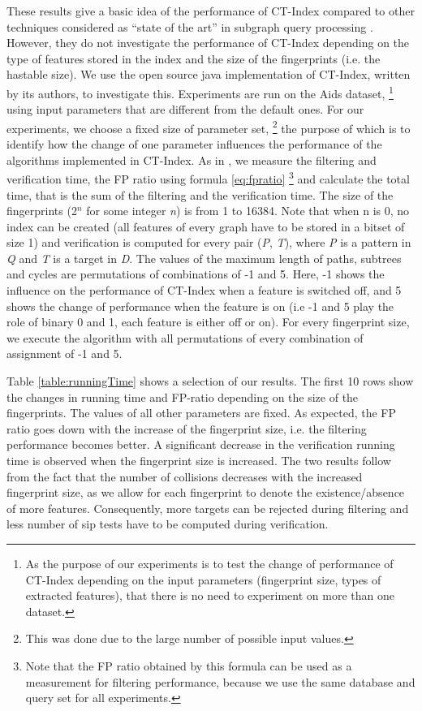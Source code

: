 \documentclass{l4proj}
\begin{document}
These results give a basic idea of the performance of CT-Index compared to other techniques considered as ``state of the art'' in subgraph query processing \cite{foteini}. However, they do not investigate the performance of CT-Index depending on the type of features stored in the index and the size of the fingerprints (i.e. the hastable size). We use the open source java implementation of CT-Index, written by its authors, to investigate this. Experiments are run on the Aids dataset, \footnote{As the purpose of our experiments is to test the change of performance of CT-Index depending on the input parameters (fingerprint size, types of extracted features), that there is no need to experiment on more than one dataset.} using input parameters that are different from the default ones. For our experiments, we choose a fixed size of parameter set, \footnote{This was done due to the large number of possible input values.} the purpose of which is to identify how the change of one parameter influences the performance of the algorithms implemented in CT-Index.  As in \cite{foteini}, we measure the filtering and verification time, the FP ratio using formula \ref{eq:fpratio} \footnote{Note that the FP ratio obtained by this formula can be used as a measurement for filtering performance, because we use the same database and query set for all experiments.} and calculate the total time, that is the sum of the filtering and the verification time. The size of the fingerprints (2$^{n}$ for some integer \emph{n}) is from 1 to 16384. Note that when n is 0, no index can be created (all features of every graph have to be stored in a bitset of size 1) and verification is computed for every pair (\emph{P}, \emph{T}), where \emph{P} is a pattern in \emph{Q} and \emph{T} is a target in \emph{D}. The values of the maximum length of paths, subtrees and cycles are permutations of combinations of -1 and 5. Here, -1 shows the influence on the performance of CT-Index when a feature is switched off, and 5 shows the change of performance when the feature is on (i.e -1 and 5 play the role of binary 0 and 1, each feature is either off or on). For every fingerprint size, we execute the algorithm with all permutations of every combination of assignment of -1 and 5.

Table \ref{table:runningTime} shows a selection of our results. The first 10 rows show the changes in running time and FP-ratio depending on the size of the fingerprints. The values of all other parameters are fixed. As expected, the FP ratio goes down with the increase of the fingerprint size, i.e. the filtering performance becomes better. A significant decrease in the verification running time is observed when the fingerprint size is increased. The two results follow from the fact that the number of collisions decreases with the increased fingerprint size, as we allow for each fingerprint to denote the existence/absence of more features. Consequently, more targets can be rejected during filtering and less number of \gls{sip} tests have to be computed during verification.
\end{document}
